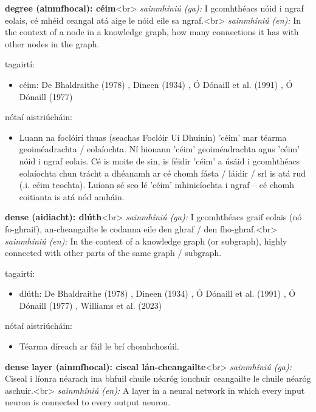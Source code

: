 \documentclass{article}
\begin{document}
\textbf{degree (ainmfhocal): céim}<br>
\textit{sainmhíniú (ga):} I gcomhthéacs nóid i ngraf eolais, cé mhéid ceangal atá aige le nóid eile sa ngraf.<br>
\textit{sainmhíniú (en):} In the context of a node in a knowledge graph, how many connections it has with other nodes in the graph.

tagairtí:
\begin{itemize}
	\item céim: De Bhaldraithe (1978) \cite{de-bhaldraithe}, Dineen (1934) \cite{dineen}, Ó Dónaill et al. (1991) \cite{focloir-beag}, Ó Dónaill (1977) \cite{odonaill}
\end{itemize}

nótaí aistriúcháin:
\begin{itemize}
	\item Luann na foclóirí thuas (seachas Foclóir Uí Dhuinín) 'céim' mar téarma geoiméadrachta / eolaíochta. Ní hionann 'céim' geoiméadrachta agus 'céim' nóid i ngraf eolais. Cé is moite de sin, is féidir 'céim' a úsáid i gcomhthéacs eolaíochta chun trácht a dhéanamh ar cé chomh fásta / láidir / srl is atá rud (.i. céim teochta). Luíonn sé seo lé 'céim' mhinicíochta i ngraf -- cé chomh coitianta is atá nód amháin.
\end{itemize}


\textbf{dense (aidiacht): dlúth}<br>
\textit{sainmhíniú (ga):} I gcomhthéacs graif eolais (nó fo-ghraif), an-cheangailte le codanna eile den ghraf / den fho-ghraf.<br>
\textit{sainmhíniú (en):} In the context of a knowledge graph (or subgraph), highly connected with other parts of the same graph / subgraph.

tagairtí:
\begin{itemize}
	\item dlúth: De Bhaldraithe (1978) \cite{de-bhaldraithe}, Dineen (1934) \cite{dineen}, Ó Dónaill et al. (1991) \cite{focloir-beag}, Ó Dónaill (1977) \cite{odonaill}, Williams et al. (2023) \cite{storchiste}
\end{itemize}

nótaí aistriúcháin:
\begin{itemize}
	\item Téarma díreach ar fáil le brí chomhchosúil.
\end{itemize}


\textbf{dense layer (ainmfhocal): ciseal lán-cheangailte}<br>
\textit{sainmhíniú (ga):} Ciseal i líonra néarach ina bhfuil chuile néaróg ionchuir ceangailte le chuile néaróg aschuir.<br>
\textit{sainmhíniú (en):} A layer in a neural network in which every input neuron is connected to every output neuron.
\end{document}
